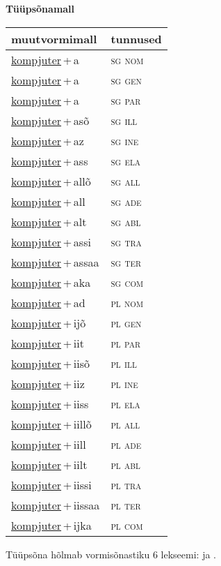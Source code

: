 
\vspace{1.8em}
\begin{minipage}{\textwidth}
\textbf{Tüüpsõnamall \,}\\

\begin{sideways}
\begin{tabular}{l l}
muutvormimall & tunnused \\
\hline
\underline{kompjuter}\,+\,a & \textsc{ sg nom } \\
\underline{kompjuter}\,+\,a & \textsc{ sg gen } \\
\underline{kompjuter}\,+\,a & \textsc{ sg par } \\
\underline{kompjuter}\,+\,asõ & \textsc{ sg ill } \\
\underline{kompjuter}\,+\,az & \textsc{ sg ine } \\
\underline{kompjuter}\,+\,ass & \textsc{ sg ela } \\
\underline{kompjuter}\,+\,allõ & \textsc{ sg all } \\
\underline{kompjuter}\,+\,all & \textsc{ sg ade } \\
\underline{kompjuter}\,+\,alt & \textsc{ sg abl } \\
\underline{kompjuter}\,+\,assi & \textsc{ sg tra } \\
\underline{kompjuter}\,+\,assaa & \textsc{ sg ter } \\
\underline{kompjuter}\,+\,aka & \textsc{ sg com } \\
\underline{kompjuter}\,+\,ad & \textsc{ pl nom } \\
\underline{kompjuter}\,+\,ijõ & \textsc{ pl gen } \\
\underline{kompjuter}\,+\,iit & \textsc{ pl par } \\
\underline{kompjuter}\,+\,iisõ & \textsc{ pl ill } \\
\underline{kompjuter}\,+\,iiz & \textsc{ pl ine } \\
\underline{kompjuter}\,+\,iiss & \textsc{ pl ela } \\
\underline{kompjuter}\,+\,iillõ & \textsc{ pl all } \\
\underline{kompjuter}\,+\,iill & \textsc{ pl ade } \\
\underline{kompjuter}\,+\,iilt & \textsc{ pl abl } \\
\underline{kompjuter}\,+\,iissi & \textsc{ pl tra } \\
\underline{kompjuter}\,+\,iissaa & \textsc{ pl ter } \\
\underline{kompjuter}\,+\,ijka & \textsc{ pl com } \\
\end{tabular}
\end{sideways}
\label{tab:tüüpsõnamall-kompjutera}

\end{minipage}

 
\vspace{1em}
\noindent Tüüpsõna hõlmab vormisõnastiku 6 lekseemi:  ja .
